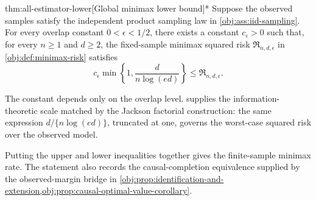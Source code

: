 \begin{theoremv}{thm:all-estimator-lower}[Global minimax lower bound]*
Suppose the observed samples satisfy the independent product sampling law in \cref{obj:ass:iid-sampling}. For every overlap constant \(0<\epsilon<1/2\), there exists a constant \(c_\epsilon>0\) such that, for every \(n\geq 1\) and \(d\geq 2\), the fixed-sample minimax squared risk \(\mathfrak R_{n,d,\epsilon}\) in \cref{obj:def:minimax-risk} satisfies
\[
c_\epsilon \min\left\{1,\frac{d}{n\log(ed)}\right\}
\leq
\mathfrak R_{n,d,\epsilon}.
\]
\end{theoremv}

The constant  depends only on the overlap level.  supplies the information-theoretic scale matched by the Jackson factorial construction: the same expression \(d/\{n\log(ed)\}\), truncated at one, governs the worst-case squared risk over the observed model.

Putting the upper and lower inequalities together gives the finite-sample minimax rate. The statement also records the causal-completion equivalence supplied by the observed-margin bridge in \cref{obj:prop:identification-and-extension,obj:prop:causal-optimal-value-corollary}.


